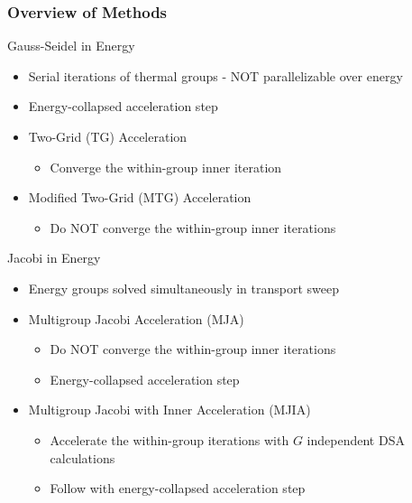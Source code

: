 \documentclass[compress,10pt]{beamer}
\begin{document}
\begin{frame}[t]\frametitle{Overview of Methods}
\begin{block}{Gauss-Seidel in Energy}
\begin{itemize}
\item Serial iterations of thermal groups - NOT parallelizable over energy
\item Energy-collapsed acceleration step
\item Two-Grid (TG) Acceleration
	\begin{itemize}
	\item Converge the within-group inner iteration
	\end{itemize}
\item Modified Two-Grid (MTG) Acceleration
	\begin{itemize}
	\item Do NOT converge the within-group inner iterations
	\end{itemize}
\end{itemize}
\end{block}
\begin{block}{Jacobi in Energy}
\begin{itemize}
\item Energy groups solved simultaneously in transport sweep
\item Multigroup Jacobi Acceleration (MJA)
	\begin{itemize}
	\item Do NOT converge the within-group inner iterations
	\item Energy-collapsed acceleration step
	\end{itemize}
\item Multigroup Jacobi with Inner Acceleration (MJIA)
	\begin{itemize}
	\item Accelerate the within-group iterations with $G$ independent DSA calculations
	\item Follow with energy-collapsed acceleration step
	\end{itemize}
\end{itemize}
\end{block}
\end{frame}
\end{document}
